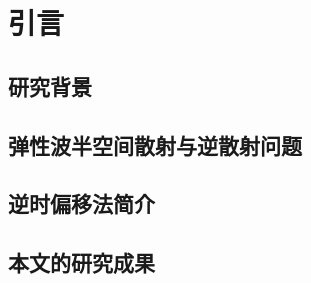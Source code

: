\chapter{引言}\label{chap:introduction}

\section{研究背景}
\section{弹性波半空间散射与逆散射问题}
\section{逆时偏移法简介}
\section{本文的研究成果}
